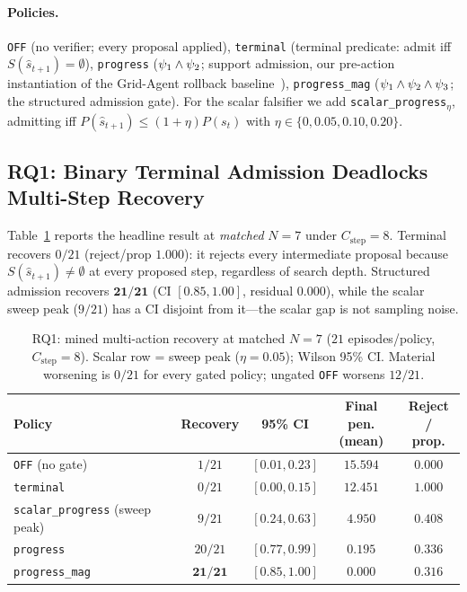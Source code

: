 \paragraph{Policies.}
\texttt{OFF} (no verifier; every proposal applied), \texttt{terminal} (terminal predicate: admit iff $S(\hat{s}_{t+1})=\emptyset$), \texttt{progress} ($\psi_1\wedge\psi_2$; support admission, our pre-action instantiation of the Grid-Agent rollback baseline~\cite{gridagent2025}), \texttt{progress\_mag} ($\psi_1\wedge\psi_2\wedge\psi_3$; the structured admission gate). For the scalar falsifier we add \texttt{scalar\_progress}$_\eta$, admitting iff $P(\hat{s}_{t+1})\le(1{+}\eta)P(s_t)$ with $\eta\in\{0,0.05,0.10,0.20\}$.

\subsection{RQ1: Binary Terminal Admission Deadlocks Multi-Step Recovery}
\label{sec:eval:rq1}

Table~\ref{tab:rq1} reports the headline result at \emph{matched} $N{=}7$ under $C_{\text{step}}{=}8$. Terminal recovers $0/21$ (reject/prop $1.000$): it rejects every intermediate proposal because $S(\hat{s}_{t+1})\ne\emptyset$ at every proposed step, regardless of search depth. Structured admission recovers $\mathbf{21/21}$ (CI $[0.85, 1.00]$, residual $0.000$), while the scalar sweep peak ($9/21$) has a CI disjoint from it---the scalar gap is not sampling noise.

\begin{table}[tb]
\centering
\caption{RQ1: mined multi-action recovery at matched $N{=}7$ ($21$ episodes/policy, $C_{\text{step}}{=}8$). Scalar row = sweep peak ($\eta{=}0.05$); Wilson 95\% CI. Material worsening is $0/21$ for every gated policy; ungated \texttt{OFF} worsens $12/21$.}
\label{tab:rq1}
\footnotesize
\begin{tabular*}{\textwidth}{@{\extracolsep{\fill}}lcccc}
\toprule
Policy & Recovery & 95\% CI & \makecell{Final pen.\\(mean)} & \makecell{Reject /\\prop.} \\
\midrule
\texttt{OFF} (no gate)                      & $1/21$   & $[0.01,0.23]$ & $15.594$ & $0.000$ \\
\texttt{terminal}                           & $0/21$   & $[0.00,0.15]$ & $12.451$ & $1.000$ \\
\texttt{scalar\_progress} (sweep peak)      & $9/21$   & $[0.24,0.63]$ & $4.950$  & $0.408$ \\
\texttt{progress}                           & $20/21$  & $[0.77,0.99]$ & $0.195$  & $0.336$ \\
\texttt{progress\_mag}                      & $\mathbf{21/21}$ & $\mathbf{[0.85,1.00]}$ & $\mathbf{0.000}$ & $0.316$ \\
\bottomrule
\end{tabular*}
\end{table}

